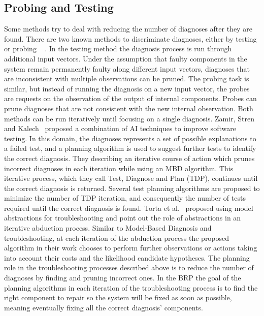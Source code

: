 \documentclass[a4paper,11pt]{report}
\begin{document}
\subsection{Probing and Testing}
Some methods try to deal with reducing the number of diagnoses after they are found. There are two known methods to discriminate diagnoses, either by testing or probing ~\cite{de1987diagnosing} . In the testing method the diagnosis process is run through additional input vectors. Under the assumption that faulty components in the system remain permanently faulty along different input vectors, diagnoses that are inconsistent with multiple observations can be pruned. The probing task is similar, but instead of running the diagnosis on a new input vector, the probes are requests on the observation of the output of internal components. Probes can prune diagnoses that are not consistent with the new internal observation. Both methods can be run iteratively until focusing on a single diagnosis.
Zamir, Stren and Kalech~\cite{zamir2014using} proposed a combination of AI techniques to improve software testing. In this domain, the diagnoses represents a set of possible explanations to a failed test, and a planning algorithm is used to suggest further tests to identify the correct diagnosis. They describing an iterative course of action which prunes incorrect diagnoses in each iteration while using an MBD algorithm. This iterative process, which they call Test, Diagnose and Plan (TDP), continues until the correct diagnosis is returned. Several test planning algorithms are proposed to minimize the number of TDP iteration, and consequently the number of tests required until the correct diagnosis is found. 
Torta et al.~\cite{Torta14} proposed using model abstractions for troubleshooting and point out the role of abstractions in an iterative abduction process. Similar to Model-Based Diagnosis and troubleshooting, at each iteration of the abduction process the proposed algorithm in their work chooses to perform further observations or actions taking into account their costs and the likelihood candidate hypotheses. %
The planning role in the troubleshooting processes described above is to reduce the number of diagnoses by finding and pruning incorrect ones. In the BRP the goal of the planning algorithms in each iteration of the troubleshooting process is to find the right component to repair so the system will be fixed as soon as possible, meaning eventually fixing all the correct diagnosis' components. 
\end{document}
